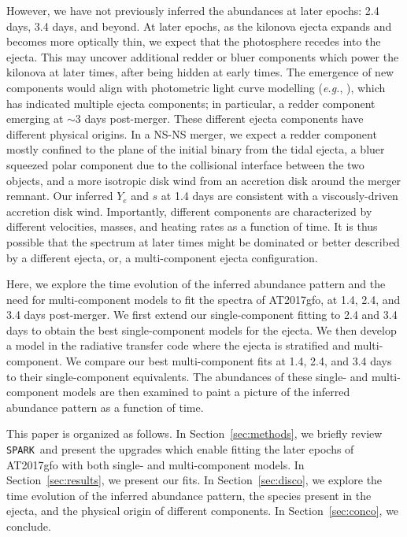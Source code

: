 \documentclass[twocolumn,twocolappendix]{aastex63}
\def\SPARK{\texttt{SPARK}}
\def\eg{{\it e.g.}}
\begin{document}
However, we have not previously inferred the abundances at later epochs: 2.4 days, 3.4 days, and beyond. At later epochs, as the kilonova ejecta expands and becomes more optically thin, we expect that the photosphere recedes into the ejecta. This may uncover additional redder or bluer components which power the kilonova at later times, after being hidden at early times. The emergence of new components would align with photometric light curve modelling (\eg, \citealt{villar17}), which has indicated multiple ejecta components; in particular, a redder component emerging at $\sim 3$ days post-merger. These different ejecta components have different physical origins. In a NS-NS merger, we expect a redder component mostly confined to the plane of the initial binary from the tidal ejecta, a bluer squeezed polar component due to the collisional interface between the two objects, and a more isotropic disk wind from an accretion disk around the merger remnant. Our inferred $Y_e$ and $s$ at 1.4 days are consistent with a viscously-driven accretion disk wind. Importantly, different components are characterized by different velocities, masses, and heating rates as a function of time. It is thus possible that the spectrum at later times might be dominated or better described by a different ejecta, or, a multi-component ejecta configuration. 

Here, we explore the time evolution of the inferred abundance pattern and the need for multi-component models to fit the spectra of AT2017gfo, at 1.4, 2.4, and 3.4 days post-merger. We first extend our single-component fitting to 2.4 and 3.4 days to obtain the best single-component models for the ejecta. We then develop a model in the radiative transfer code where the ejecta is stratified and multi-component. We compare our best multi-component fits at 1.4, 2.4, and 3.4 days to their single-component equivalents. The abundances of these single- and multi-component models are then examined to paint a picture of the inferred abundance pattern as a function of time. 

This paper is organized as follows. In Section~\ref{sec:methods}, we briefly review \SPARK~and present the upgrades which enable fitting the later epochs of AT2017gfo with both single- and multi-component models. In Section~\ref{sec:results}, we present our fits. In Section~\ref{sec:disco}, we explore the time evolution of the inferred abundance pattern, the species present in the ejecta, and the physical origin of different components. In Section~\ref{sec:conco}, we conclude.
\end{document}

